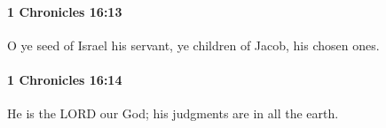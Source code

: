 		\paragraph{1 Chronicles 16:13} %
			\label{1CHRONICLES-16-13}

			O ye seed of Israel his servant, ye children of Jacob, his chosen ones.


		\paragraph{1 Chronicles 16:14} %
			\label{1CHRONICLES-16-14}

			He is the LORD our God; his judgments are in all the earth.


